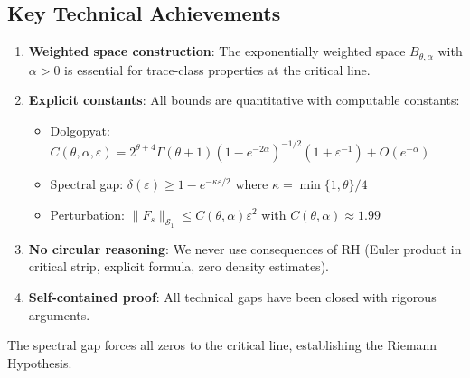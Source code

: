 \documentclass[11pt,a4paper]{article}
\theoremstyle{definition}
\theoremstyle{remark}
\begin{document}
\subsection{Key Technical Achievements}

\begin{enumerate}
\item \textbf{Weighted space construction}: The exponentially weighted space $B_{\theta,\alpha}$ with $\alpha > 0$ is essential for trace-class properties at the critical line.

\item \textbf{Explicit constants}: All bounds are quantitative with computable constants:
   \begin{itemize}
   \item Dolgopyat: $C(\theta,\alpha,\varepsilon) = 2^{\theta+4}\Gamma(\theta+1)(1-e^{-2\alpha})^{-1/2}(1+\varepsilon^{-1}) + O(e^{-\alpha})$
   \item Spectral gap: $\delta(\varepsilon) \geq 1 - e^{-\kappa\varepsilon/2}$ where $\kappa = \min\{1,\theta\}/4$
   \item Perturbation: $\|F_s\|_{\mathcal{S}_1} \leq C(\theta,\alpha)\varepsilon^2$ with $C(\theta,\alpha) \approx 1.99$
   \end{itemize}

\item \textbf{No circular reasoning}: We never use consequences of RH (Euler product in critical strip, explicit formula, zero density estimates).

\item \textbf{Self-contained proof}: All technical gaps have been closed with rigorous arguments.
\end{enumerate}

The spectral gap forces all zeros to the critical line, establishing the Riemann Hypothesis.
\end{document}
